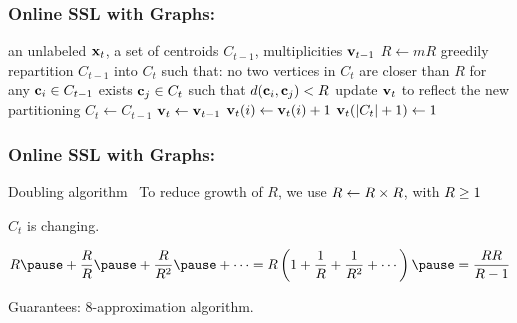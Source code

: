 \documentclass{beamer}
\begin{document}
\begin{frame}
\frametitle{Online SSL with Graphs: }
\vspace{-0.7em}
\renewcommand{\ng}{k}
\begin{algorithm}[H]
\begin{algorithmic}[1]
{\small
     \STATE  an unlabeled $\mathbf{x}_t$, a set of centroids $C_{t - 1}$, multiplicities $\mathbf{v}_{t - 1}$ \pause
    \IF{$(\abs{C_{t - 1}} = \ng + 1)$} 
    \STATE  $R \gets m R$ 
    \STATE \pause greedily repartition $C_{t - 1}$ into $C_t$ such that: 
    \STATE  \quad no two vertices in $C_t$ are closer than $R$ 
     \STATE \quad  for any $\mathbf{c}_i \in C_{t - 1}$ exists $\mathbf{c}_j \in C_t$ such that $d(\mathbf{c}_i, \mathbf{c}_j) < R$ 
     \STATE  \pause update $\mathbf{v}_t$ to reflect the new partitioning 
    \ELSE
     \STATE  $C_t \gets C_{t - 1}$ 
     \STATE  $\mathbf{v}_t \gets \mathbf{v}_{t - 1}$ \pause
    \ENDIF
    \STATE  $\mathbf{v}_t(i) \gets \mathbf{v}_t(i) + 1$ 
    \ELSE 
    \STATE \pause $\mathbf{v}_t(\left|C_t\right| + 1) \gets 1$     
    \ENDIF
}
\end{algorithmic}
  \caption*{Online $k$-centers}
\end{algorithm}
\end{frame}
\begin{frame}
\frametitle{Online SSL with Graphs: }

Doubling algorithm~\cite{charikar1997incremental} 
\moveb
\pause
To reduce growth of  $R$, we use $R \gets R\times R$, with $R\geq 1$
\moveb
\pause

$C_t$ is changing. 
\pause

\begin{displaymath}
R  \pause + \frac{R}{\Rmultiplier} \pause + \frac{R}{\Rmultiplier^2} \pause + \cdots 
= R\left(1 + \frac{1}{\Rmultiplier} + \frac{1}{\Rmultiplier^2} + \cdots \right) \pause 
=  \frac{R\Rmultiplier}{\Rmultiplier-1}	
\end{displaymath}

\pause
Guarantees\pause: 8-approximation algorithm.
\pause
{}

\end{frame}
\end{document}
